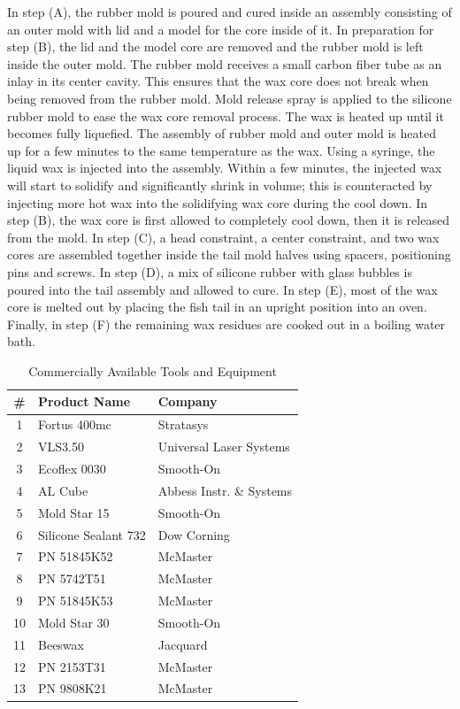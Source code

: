 In step (A), the rubber mold is poured and cured inside an assembly consisting of an outer mold with lid and a model for the core inside of it.
In preparation for step (B), the lid and the model core are removed and the rubber mold is left inside the outer mold. 
The rubber mold receives a small carbon fiber tube as an inlay in its center cavity.
This ensures that the wax core does not break when being removed from the rubber mold.
Mold release spray is applied to the silicone rubber mold to ease the wax core removal process. 
The wax is heated up until it becomes fully liquefied. 
The assembly of rubber mold and outer mold is heated up for a few minutes to the same temperature as the wax.
Using a syringe, the liquid wax is injected into the assembly.
Within a few minutes, the injected wax will start to solidify and significantly shrink in volume; this is counteracted by injecting more hot wax into the solidifying wax core during the cool down.
In step (B), the wax core is first allowed to completely cool down, then it is released from the mold. 
In step (C), a head constraint, a center constraint, and two wax cores are assembled together inside the tail mold halves using spacers, positioning pins and screws. 
In step (D), a mix of silicone rubber with glass bubbles is poured into the tail assembly and allowed to cure.
In step (E), most of the wax core is melted out by placing the fish tail in an upright position into an oven. Finally, in step (F) the remaining wax residues are cooked out in a boiling water bath. 


\begin{table}[htb]
\caption{Commercially Available Tools and Equipment}
\centering
\begin{tabular}{c l l}
\hline
\hline
\# & Product Name & Company\\
\hline
1 & Fortus 400mc & Stratasys\\
2 & VLS3.50 & Universal Laser Systems\\
3 & Ecoflex 0030 & Smooth-On\\
4 & AL Cube & Abbess Instr. \& Systems\\
5 & Mold Star 15 & Smooth-On\\
6 & Silicone Sealant 732 & Dow Corning\\
7 & PN 51845K52 & McMaster\\
8 & PN 5742T51 & McMaster\\
9 & PN 51845K53 & McMaster\\
10 & Mold Star 30 & Smooth-On\\
11 & Beeswax & Jacquard\\
12 & PN 2153T31& McMaster\\
13 & PN 9808K21& McMaster\\
\hline
\end{tabular}
\label{tab:MachineTools}
\end{table} 